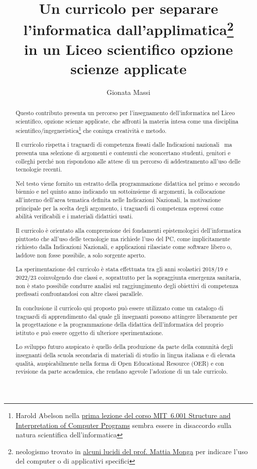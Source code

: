 \documentclass[a4paper]{easychair}
\title{Un curricolo per separare l'informatica dall'applimatica\thanks{neologismo %
trovato in \href{https://aladdin.unimi.it/materiali/talk/2012_mirabilandia.pdf}%
{alcuni lucidi del prof. Mattia Monga} per indicare l'uso del computer o di applicativi specifici}\\ in un %
Liceo scientifico opzione scienze applicate}
\author{
Gionata Massi\institute{
  IIS Savoia Benincasa, Ancona (AN)
 }
}
\institute{
  IIS Savoia Benincasa, Ancona (AN)\\
  \email{gionata.massi@savoiabenincasa.it}
}
\begin{document}
\maketitle

\begin{abstract}
Questo contributo presenta un percorso per l'insegnamento dell'informatica
nel Liceo scientifico, opzione scienze applicate, che affronti la materia intesa come
una disciplina scientifico/ingegneristica\footnote{Harold Abelson nella
\href{https://youtu.be/-J_xL4IGhJA}{prima lezione del corso MIT~6.001
Structure and Interpretation of Computer Programs}
sembra essere in disaccordo sulla natura scientifica dell'informatica
} che coniuga creatività e metodo.

Il curricolo rispetta i traguardi di competenza fissati dalle Indicazioni
nazionali~\cite{IlMinistro2010}
ma presenta una selezione di argomenti e contenuti
che sconcertano studenti, genitori e colleghi perché non rispondono alle attese di un
percorso di addestramento all'uso delle tecnologie recenti.

Nel testo viene fornito un estratto della programmazione didattica nel primo e secondo biennio e nel quinto anno
indicando un sottoinsieme di argomenti,
la collocazione all'interno dell'area tematica definita nelle Indicazioni Nazionali,
la motivazione principale per la scelta degli argomento,
i traguardi di competenza espressi come abilità verificabili e i materiali didattici usati.

Il curricolo è orientato alla comprensione dei fondamenti epistemologici
dell'informatica piuttosto che all'uso delle tecnologie ma richiede l'uso del PC,
come implicitamente richiesto dalla Indicazioni Nazionali, e applicazioni rilasciate
come software libero o, laddove non fosse possibile, a solo sorgente aperto.

La sperimentazione del curricolo è stata effettuata tra gli anni scolastici
2018/19 e 2022/23 coinvolgendo due classi e, soprattutto per la sopraggiunta
emergenza sanitaria, non è stato possibile condurre analisi
sul raggiungimento degli obiettivi di competenza prefissati confrontandosi con altre
classi parallele.

In conclusione il curricolo qui proposto può essere utilizzato come un
catalogo di traguardi di apprendimento dal quale gli insegnanti possono attingere liberamente
per la progettazione e la programmazione della didattica dell'informatica%
del proprio istituto e può essere oggetto di ulteriore sperimentazione.

Lo sviluppo futuro auspicato è quello della produzione da parte della comunità degli insegnanti
della scuola secondaria di materiali di studio in lingua italiana e di elevata qualità,
auspicabilmente nella forma di Open Educational Resource (OER) e con revisione da parte accademica,
che rendano agevole l'adozione di un tale curricolo.
\end{abstract}
\end{document}
